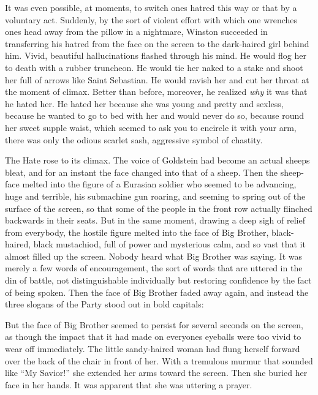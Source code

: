 It was even possible, at moments, to switch one\textquotesingle s hatred
this way or that by a voluntary act. Suddenly, by the sort of violent
effort with which one wrenches one\textquotesingle s head away from the
pillow in a nightmare, Winston succeeded in transferring his hatred from
the face on the screen to the dark-haired girl behind him. Vivid,
beautiful hallucinations flashed through his mind. He would flog her to
death with a rubber truncheon. He would tie her naked to a stake and
shoot her full of arrows like Saint Sebastian. He would ravish her and
cut her throat at the moment of climax. Better than before, moreover, he
realized \emph{why} it was that he hated her. He hated her because she
was young and pretty and sexless, because he wanted to go to bed with
her and would never do so, because round her sweet supple waist, which
seemed to ask you to encircle it with your arm, there was only the
odious scarlet sash, aggressive symbol of chastity.

The Hate rose to its climax. The voice of Goldstein had become an actual
sheep\textquotesingle s bleat, and for an instant the face changed into
that of a sheep. Then the sheep-face melted into the figure of a
Eurasian soldier who seemed to be advancing, huge and terrible, his
submachine gun roaring, and seeming to spring out of the surface of the
screen, so that some of the people in the front row actually flinched
backwards in their seats. But in the same moment, drawing a deep sigh of
relief from everybody, the hostile figure melted into the face of Big
Brother, black-haired, black mustachio\textquotesingle d, full of power
and mysterious calm, and so vast that it almost filled up the screen.
Nobody heard what Big Brother was saying. It was merely a few words of
encouragement, the sort of words that are uttered in the din of battle,
not distinguishable individually but restoring confidence by the fact of
being spoken. Then the face of Big Brother faded away again, and instead
the three slogans of the Party stood out in bold capitals:


But the face of Big Brother seemed to persist for several seconds on the
screen, as though the impact that it had made on
everyone\textquotesingle s eyeballs were too vivid to wear off
immediately. The little sandy-haired woman had flung herself forward
over the back of the chair in front of her. With a tremulous murmur that
sounded like ``My Savior!'' she extended her arms toward the screen. Then
she buried her face in her hands. It was apparent that she was uttering
a prayer.

